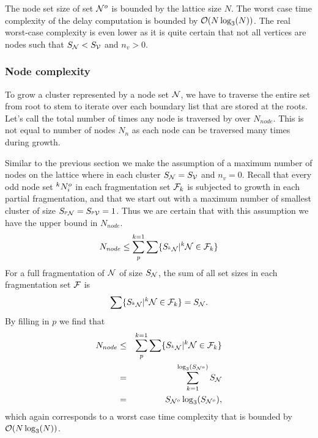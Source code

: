 The node set size of set $\mathcal{N}^o$ is bounded by the lattice size $N$. The worst case time complexity of the delay computation is bounded by $\mathcal{O}(N\log_3(N))$. The real worst-case complexity is even lower as it is quite certain that not all vertices are nodes such that $S_{\mathcal{N}} < S_{\mathcal{V}}$ and $n_v > 0$.

\subsubsection{Node complexity}

To grow a cluster represented by a node set $\mathcal{N}$, we have to traverse the entire set from root to stem to iterate over each boundary list that are stored at the roots. Let's call the total number of times any node is traversed by  over $N_{node}$. This is not equal to number of nodes $N_n$ as each node can be traversed many times during growth.

Similar to the previous section we make the assumption of a maximum number of nodes on the lattice where in each cluster $S_{\mathcal{N}} = S_{\mathcal{V}}$ and $n_v = 0$. Recall that every odd node set ${}^{k}N^o_i$ in each fragmentation set $\mathcal{F}_k$ is subjected to growth in each partial fragmentation, and that we start out with a maximum number of smallest cluster of size $S_{{}^{p}\mathcal{N}} = S_{{}^{p}\mathcal{V}} = 1$. Thus we are certain that with this assumption we have the upper bound in $N_{node}$.
\begin{equation}\label{eq:nnode}
  N_{node} \leq \sum_{p}^{k=1}\sum \{ S_{{}^{k}\mathcal{N}} | {}^{k}\mathcal{N} \in \mathcal{F}_k \}
\end{equation}
For a full fragmentation of $\mathcal{N}$ of size $S_{\mathcal{N}}$, the sum of all set sizes in each fragmentation set $\mathcal{F}$ is
\begin{equation}\label{eq:sumsetsfrag}
  \sum \{S_{{}^{k}\mathcal{N}} | {}^{k}\mathcal{N} \in \mathcal{F}_k \} = S_{\mathcal{N}}.
\end{equation}
By filling in $p$ we find that
\begin{eqnarray}
  \nonumber N_{node} &\leq& \sum_{p}^{k=1}\sum \{ S_{{}^{k}\mathcal{N}} | {}^{k}\mathcal{N} \in \mathcal{F}_k \} \\
  \nonumber &=& \sum_{k=1}^{\log_3(S_{\mathcal{N}^o})} S_{\mathcal{N}} \\
   &=& S_{\mathcal{N}^o}\log_3(S_{\mathcal{N}^o}),
\end{eqnarray}
which again corresponds to a worst case time complexity that is bounded by $\mathcal{O}(N\log_3(N))$. 